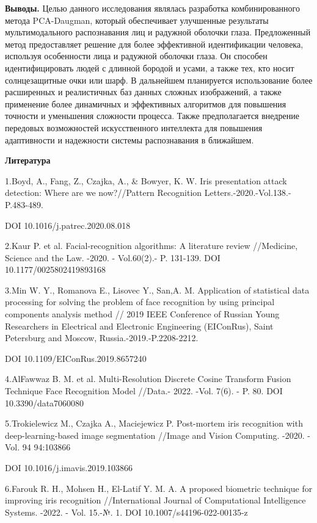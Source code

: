 {\bfseries Выводы.} Целью данного исследования являлась разработка
комбинированного метода PCA-Daugman, который обеспечивает улучшенные
результаты мультимодального распознавания лиц и радужной оболочки глаза.
Предложенный метод предоставляет решение для более эффективной
идентификации человека, используя особенности лица и радужной оболочки
глаза. Он способен идентифицировать людей с длинной бородой и усами, а
также тех, кто носит солнцезащитные очки или шарф. В дальнейшем
планируется использование более расширенных и реалистичных баз данных
сложных изображений, а также применение более динамичных и эффективных
алгоритмов для повышения точности и уменьшения сложности процесса. Также
предполагается внедрение передовых возможностей искусственного
интеллекта для повышения адаптивности и надежности системы распознавания
в ближайшем.

{\bfseries Литература}

1.Boyd, A., Fang, Z., Czajka, A., \& Bowyer, K. W. Iris presentation
attack detection: Where are we now?//Pattern Recognition
Letters.-2020.-Vol.138.-P.483-489.

DOI 10.1016/j.patrec.2020.08.018

2.Kaur P. et al. Facial-recognition algorithms: A literature review
//Medicine, Science and the Law. -2020. - Vol.60(2).- P. 131-139. DOI
10.1177/0025802419893168

3.Min W. Y., Romanova E., Lisovec Y., San,A. M. Application of
statistical data processing for solving the problem of face recognition
by using principal components analysis method // 2019 IEEE Conference of
Russian Young Researchers in Electrical and Electronic Engineering
(EIConRus), Saint Petersburg and Moscow, Russia.-2019.-P.2208-2212.

DOI 10.1109/EIConRus.2019.8657240

4.AlFawwaz B. M. et al. Multi-Resolution Discrete Cosine Transform
Fusion Technique Face Recognition Model //Data.- 2022. -Vol. 7(6). - P.
80. DOI 10.3390/data7060080

5.Trokielewicz M., Czajka A., Maciejewicz P. Post-mortem iris
recognition with deep-learning-based image segmentation //Image and
Vision Computing. -2020. - Vol. 94 94:103866

DOI 10.1016/j.imavis.2019.103866

6.Farouk R. H., Mohsen H., El-Latif Y. M. A. A proposed biometric
technique for improving iris recognition //International Journal of
Computational Intelligence Systems. -2022. - Vol. 15.-№. 1. DOI
10.1007/s44196-022-00135-z

